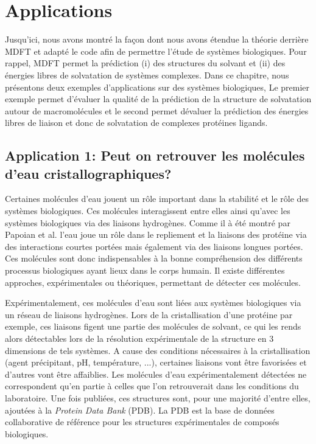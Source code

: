 \chapter{Applications}


Jusqu'ici, nous avons montré la façon dont nous avons étendue la théorie derrière MDFT et adapté le code afin de permettre l'étude de systèmes biologiques. Pour rappel, MDFT permet la prédiction (i) des structures du solvant et (ii) des énergies libres de solvatation de systèmes complexes. Dans ce chapitre, nous présentons deux exemples d'applications sur des systèmes biologiques, Le premier exemple permet d'évaluer la qualité de la prédiction de la structure de solvatation autour de macromolécules et le second permet dévaluer la prédiction des énergies libres de liaison et donc de solvatation de complexes protéines ligands.


\clearpage
\section{Application 1: Peut on retrouver les molécules d'eau cristallographiques?}
Certaines molécules d'eau jouent un rôle important dans la stabilité et le rôle des systèmes biologiques. Ces molécules interagissent entre elles ainsi qu'avec les systèmes biologiques via des liaisons hydrogènes. Comme il à été montré par Papoian et al. \cite{papoian_water_2004} l'eau joue un rôle dans le repliement et la liaisons des protéine via des interactions courtes portées mais également via des liaisons longues portées. Ces molécules sont donc indispensables à la bonne compréhension des différents processus biologiques ayant lieux dans le corps humain. Il existe différentes approches, expérimentales ou théoriques, permettant de détecter ces molécules.

Expérimentalement, ces molécules d'eau sont liées aux systèmes biologiques via un réseau de liaisons hydrogènes. Lors de la cristallisation d'une protéine par exemple, ces liaisons figent une partie des molécules de solvant, ce qui les rends alors détectables lors de la résolution expérimentale de la structure en 3 dimensions de tels systèmes. A cause des conditions nécessaires à la cristallisation \cite{wlodawer_advanced_2017} (agent précipitant, pH, température, ...), certaines liaisons vont être favorisées et d'autres vont être affaiblies. Les molécules d'eau expérimentalement détectées ne correspondent qu'en partie à celles que l'on retrouverait dans les conditions du laboratoire. Une fois publiées, ces structures sont, pour une majorité d'entre elles, ajoutées à la \textit{Protein Data Bank}\cite{pdb_2011} (PDB). La PDB est la base de données collaborative de référence pour les structures expérimentales de composés biologiques.

